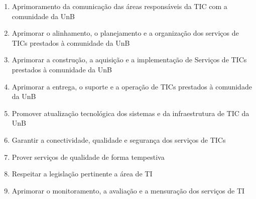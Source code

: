 \begin{enumerate}
\item Aprimoramento da comunicação das áreas responsáveis da TIC com a comunidade da UnB
\item Aprimorar o alinhamento, o planejamento e a organização dos serviços de TICs prestados à comunidade da UnB
\item Aprimorar  a  construção,  a  aquisição  e  a  implementação  de  Serviços  de  TICs  prestados  à comunidade da UnB
\item Aprimorar a entrega, o suporte e a operação de TICs prestados à comunidade da UnB
\item Promover atualização tecnológica dos sistemas 
e da infraestrutura de TIC da UnB
\item Garantir a conectividade, qualidade e segurança dos serviços de TICs
\item Prover serviços de qualidade de forma tempestiva
\item Respeitar a legislação pertinente a área de TI
\item Aprimorar o monitoramento, a avaliação e a mensuração dos serviços de TI
\end{enumerate}

